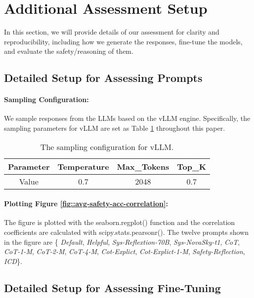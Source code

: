 \section{Additional Assessment Setup}
\label{sec::complete_assess_setup}
\par In this section, we will provide details of our assessment for clarity and reproducibility, including how we generate the responses, fine-tune the models, and evaluate the safety/reasoning of them.


\subsection{Detailed Setup for Assessing Prompts}
\label{sec::complete_setup_prompting}
\paragraph{Sampling Configuration: }We sample responses from the LLMs based on the vLLM \citep{vllm} engine. Specifically, the sampling parameters for vLLM are set as Table \ref{tab::sampling_parameter} throughout this paper.

\begin{table}[h]
    \centering
    \small
    \caption{The sampling configuration for vLLM.}
    \begin{tabular}{| c | c c c |}
        \toprule
         Parameter & Temperature & Max\_Tokens & Top\_K \\
         \midrule
         Value & 0.7 & 2048 & 0.7 \\
         \bottomrule
    \end{tabular}
    \label{tab::sampling_parameter}
\end{table}

\paragraph{Plotting Figure \ref{fig::avg-safety-acc-correlation}: }The figure is plotted with the seaborn.regplot() function and the correlation coefficients are calculated with scipy.stats.pearsonr(). The twelve prompts shown in the figure are \{ \textit{Default}, \textit{Helpful}, \textit{Sys-Reflextion-70B}, \textit{Sys-NovaSky-t1}, \textit{CoT}, \textit{CoT-1-M}, \textit{CoT-2-M}, \textit{CoT-4-M}, \textit{Cot-Explict}, \textit{Cot-Explict-1-M}, \textit{Safety-Reflection}, \textit{ICD}\}. 

\subsection{Detailed Setup for Assessing Fine-Tuning}
\label{sec::complete_setup_finetuning}


